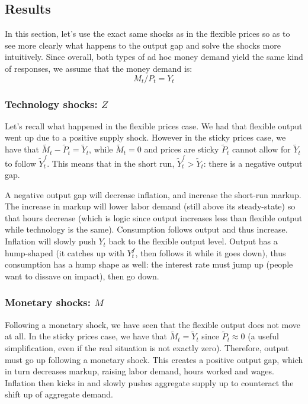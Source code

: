 \documentclass[12pt]{report}
\begin{document}
\subsection{Results}

In this section, let's use the exact same shocks as in the flexible prices so as to see more clearly what happens to the output gap and solve the shocks more intuitively. Since overall, both types of ad hoc money demand yield the same kind of responses, we assume that the money demand is: $$ M_t/P_t = Y_t $$

\subsubsection{Technology shocks: $Z$}

Let's recall what happened in the flexible prices case. We had that flexible output went up due to a positive supply shock. However in the sticky prices case, we have that $\tilde M_t - \tilde P_t = \tilde Y_t$, while $\tilde M_t = 0$ and prices are sticky $\tilde P_t$ cannot allow for $\tilde Y_t$ to follow $\tilde Y_t^f$. This means that in the short run, $\tilde Y_t^f > \tilde Y_t$: there is a negative output gap. 

A negative output gap will decrease inflation, and increase the short-run markup. The increase in markup will lower labor demand (still above its steady-state) so that hours decrease (which is logic since output increases less than flexible output while technology is the same). Consumption follows output and thus increase. Inflation will slowly push $Y_t$ back to the flexible output level. Output has a hump-shaped (it catches up with $Y_t^f$, then follows it while it goes down), thus consumption has a hump shape as well: the interest rate must jump up (people want to dissave on impact), then go down.

\subsubsection{Monetary shocks: $M$}

Following a monetary shock, we have seen that the flexible output does not move at all. In the sticky prices case, we have that $\tilde M_t = \tilde Y_t$ since $\tilde P_t \approx 0$ (a useful simplification, even if the real situation is not exactly zero). Therefore, output must go up following a monetary shock. This creates a positive output gap, which in turn decreases markup, raising labor demand, hours worked and wages. Inflation then kicks in and slowly pushes aggregate supply up to counteract the shift up of aggregate demand.
\end{document}
